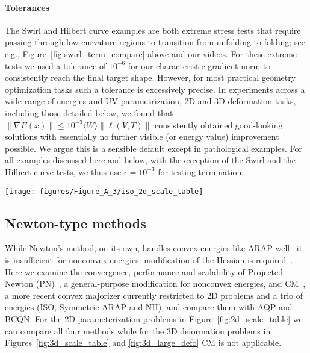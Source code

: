 \paragraph{Tolerances} The Swirl and Hilbert curve examples are
both extreme stress tests that require passing through low curvature
regions to transition from unfolding to folding; see e.g.,
Figure~\ref{fig:swirl_term_compare} above and our videos. For these
extreme tests we used a tolerance of $10^{-6}$ for our characteristic
gradient norm to consistently reach the final target shape.
However, for most practical geometry optimization tasks such a tolerance
is excessively precise. In experiments across a wide range of
energies and UV parametrization, 2D and 3D deformation tasks,
including those detailed below, we found that
$\|\nabla E(x)\| \leq 10^{-3} \langle W \rangle \| \ell(V,T) \|$
consistently obtained good-looking solutions with essentially no
further visible (or energy value) improvement possible. We
argue this is a sensible default except in pathological examples.
For all examples discussed here and below, with the exception of the
Swirl and the Hilbert curve tests, we thus use $\epsilon=10^{-3}$ for
testing termination.

\begin{figure*}[h!]
\centering
\texttt{[image: figures/Figure\_A\_3/iso\_2d\_scale\_table]}
\caption{
Performance statistics and memory use for increasing mesh
sizes up to 23.9M triangles, comparing BCQN with AQP, PN
and CM. For the Gorilla UV parametrization with ISO energy we
repeatedly double the mesh resolution and, for each method, report
number of iterations to convergence (characteristic norm $< 10^{-3}$),
wall-clock time (seconds) to convergence, and the nonzero fill-in
for the linear systems solved by each method. We use \red{\bf*} to
indicate out-of-memory failure for matrix factorization; see
\S\ref{sec:results} for discussion. Also note that stencils for CM
and PN are identical (differing only by actual entries) while AQP
and BCQN both solve with the same smaller scalar Laplacian.}
\label{fig:2d_scale_table}
\end{figure*}


\subsection{Newton-type methods}
\label{sec:newton-type}

While Newton's method, on its own, handles convex energies like ARAP well~\cite{Chao:2010:ASG}
it is insufficient for nonconvex energies: modification of the Hessian is
required~\cite{Shtengel:2017:GOV,Nocedal:2006:Book}. Here we examine
the convergence, performance and scalability of Projected Newton (PN)~\cite{Teran:2005:RQF},
a general-purpose modification for nonconvex energies, and
CM~\cite{Shtengel:2017:GOV}, a more recent convex majorizer currently restricted
to 2D problems and a trio of energies (ISO, Symmetric ARAP and NH), and compare them with 
AQP and BCQN.
For the 2D parameterization problems in Figure~\ref{fig:2d_scale_table}
we can compare all four methods while for the 3D deformation
problems in Figures~\ref{fig:3d_scale_table} and \ref{fig:3d_large_defo}
CM is not applicable.

